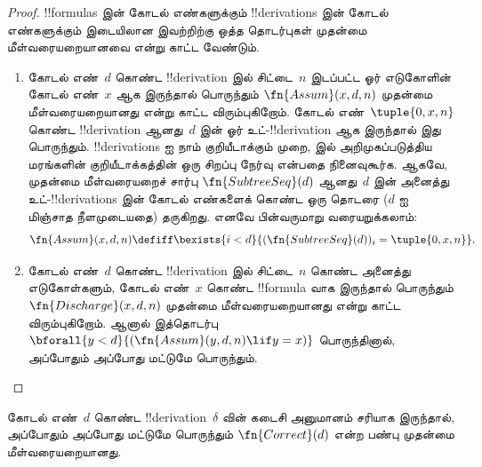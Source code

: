 \documentclass[../../../include/open-logic-section]{subfiles}
\begin{document}
\begin{proof}
  !!{formula}s இன் கோடல் எண்களுக்கும் !!{derivation}s இன் கோடல்
  எண்களுக்கும் இடையிலான இவற்றிற்கு ஒத்த தொடர்புகள் முதன்மை
  மீள்வரையறையானவை என்று காட்ட வேண்டும்.
  \begin{enumerate}
  \item கோடல் எண்~$d$ கொண்ட !!{derivation} இல் சிட்டை~$n$ இடப்பட்ட
    ஓர் எடுகோளின் கோடல் எண்~$x$ ஆக இருந்தால் பொருந்தும்
    $\fn{Assum}(x, d, n)$ முதன்மை மீள்வரையறையானது என்று காட்ட விரும்புகிறோம்.
    கோடல் எண்~$\tuple{0, x, n}$ கொண்ட !!{derivation} ஆனது~$d$ இன்
    ஓர் உட்-!!{derivation} ஆக இருந்தால் இது பொருந்தும். !!{derivation}s ஐ
    நாம் குறியீடாக்கும் முறை,
    இல் அறிமுகப்படுத்திய
    மரங்களின் குறியீடாக்கத்தின் ஒரு சிறப்பு நேர்வு என்பதை நினைவுகூர்க.
    ஆகவே, முதன்மை மீள்வரையறைச் சார்பு $\fn{SubtreeSeq}(d)$ ஆனது~$d$ இன்
    அனைத்து உட்-!!{derivation}s இன் கோடல் எண்களைக் கொண்ட ஒரு தொடரை
    ($d$ ஐ மிஞ்சாத நீளமுடையதை) தருகிறது. எனவே பின்வருமாறு வரையறுக்கலாம்:
    \[
    \fn{Assum}(x, d, n) \defiff \bexists{i<d}{(\fn{SubtreeSeq}(d))_i =
      \tuple{0, x, n}}.
    \]
  \item கோடல் எண்~$d$ கொண்ட !!{derivation} இல் சிட்டை~$n$ கொண்ட
    அனைத்து எடுகோள்களும், கோடல் எண்~$x$ கொண்ட !!{formula} வாக இருந்தால்
    பொருந்தும் $\fn{Discharge}(x, d, n)$ முதன்மை மீள்வரையறையானது என்று
    காட்ட விரும்புகிறோம். ஆனால் இத்தொடர்பு
    $\bforall{y<d}{(\fn{Assum}(y, d, n) \lif y = x)}$ பொருந்தினால்,
    அப்போதும் அப்போது மட்டுமே பொருந்தும்.
  \end{enumerate}
\end{proof}

\begin{prop}
  கோடல் எண்~$d$ கொண்ட !!{derivation}~$\delta$ வின் கடைசி அனுமானம்
  சரியாக இருந்தால், அப்போதும் அப்போது மட்டுமே பொருந்தும்
  $\fn{Correct}(d)$ என்ற பண்பு முதன்மை மீள்வரையறையானது.
\end{prop}
\end{document}
